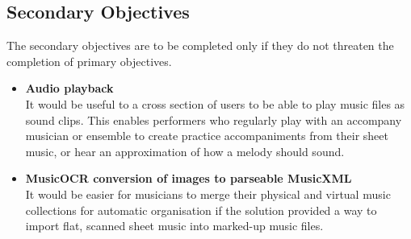 \subsection{Secondary Objectives}
The secondary objectives are to be completed only if they do not threaten the completion of primary objectives.

\begin{itemize}
    \item \textbf{Audio playback}\\
    It would be useful to a cross section of users to be able to play music files as sound clips. This enables performers who regularly play with an accompany musician or ensemble to create practice accompaniments from their sheet music, or hear an approximation of how a melody should sound.
    \item \textbf{MusicOCR conversion of images to parseable MusicXML}\\
It would be easier for musicians to merge their physical and virtual music collections for automatic organisation if the solution provided a way to import flat, scanned sheet music into marked-up music files. 
\end{itemize}
